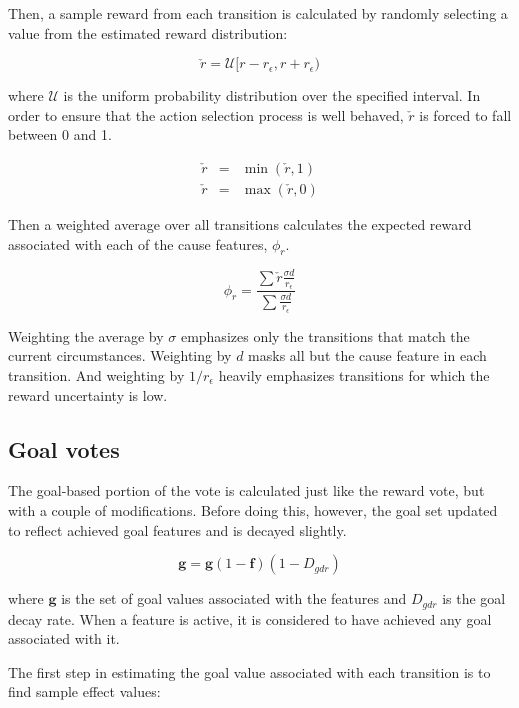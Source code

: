 Then, a sample reward from each transition is calculated by randomly selecting a value from the estimated reward distribution:

\begin{equation}
\check{r} = \mathcal{U}[r - r_{\epsilon},r + r_{\epsilon})
\end{equation}

where $ \mathcal{U}$ is the uniform probability distribution over the specified interval.
In order to ensure that the action selection process is well behaved, $\check{r}$ is forced to fall between 0 and 1.

\begin{eqnarray}
\check{r} &=& \min(\check{r}, 1) \\
\check{r} &=& \max(\check{r}, 0)
\end{eqnarray}
    
Then a weighted average over all transitions calculates the expected reward associated with each of the cause features, $\phi_r$.

\begin{equation}
\phi_r = \frac{\sum \check{r} \frac{\sigma d} {r_{\epsilon}}}{\sum \frac{\sigma d} {r_{\epsilon}}} 
\end{equation}

Weighting the average by $\sigma$ emphasizes only the transitions that match the current circumstances. Weighting by $d$ masks all but the cause feature in each transition. And weighting by $1 / r_{\epsilon}$ heavily emphasizes transitions for which the reward uncertainty is low.

\subsection{Goal votes}

The goal-based portion of the vote is calculated just like the reward vote, but with a couple of modifications. Before doing this, however, the goal set updated to reflect achieved goal features and is decayed slightly.

\begin{equation}
\mathbf{g} = \mathbf{g}(1 - \mathbf{f})(1 - D_{gdr})
\end{equation}

where $\mathbf{g}$ is the set of goal values associated with the features and $D_{gdr}$ is the goal decay rate. When a feature is active, it is considered to have achieved any goal associated with it.
 
The first step in estimating the goal value associated with each transition is to find sample effect values:

